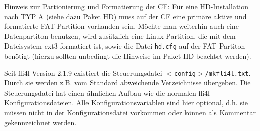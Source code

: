  Hinweis zur Partionierung und Formatierung der CF:
  Für eine HD-Installation nach TYP A (siehe dazu Paket HD) muss auf der CF eine
  primäre aktive und formatierte FAT-Partition vorhanden sein. Möchte man
  weiterhin auch eine Datenpartiton benutzen, wird zusätzlich eine Linux-Partition,
  die mit dem Dateisystem ext3 formatiert ist, sowie die Datei \texttt{hd.cfg} auf der
  FAT-Partiton benötigt (hierzu sollten unbedingt die Hinweise im Paket HD beachtet
  werden).

  Seit fli4l-Version 2.1.9 existiert die Steuerungsdatei
  \texttt{$<$config$>$/mkfli4l.txt}. Durch sie werden z.B. vom Standard
  abweichende Verzeichnisse übergeben. Die Steuerungsdatei hat einen
  ähnlichen Aufbau wie die normalen fli4l Konfigurationsdateien.
  Alle Konfigurationsvariablen sind hier optional, d.h. sie müssen nicht
  in der Konfigurationsdatei vorkommen oder können als Kommentar gekennzeichnet
  werden.
